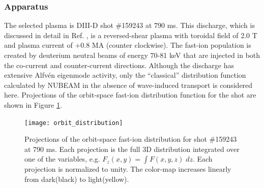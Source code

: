 \subsubsection{Apparatus} \label{sec:apparatus}
The selected plasma is 
DIII-D shot \#159243 at 790 ms. This discharge, which is discussed in detail in
 Ref. \cite{heidbrink2017}, is a reversed-shear plasma with toroidal field of 2.0 T and
plasma current of +0.8 MA (counter clockwise). The fast-ion population is created by
deuterium neutral beams of energy 70-81 keV that are injected in
both the co-current and counter-current directions. Although the discharge has extensive Alfv\'en
eigenmode activity, only the ``classical'' distribution function calculated by NUBEAM
\cite{NUBEAM} in the absence of wave-induced transport is considered here.
Projections of the orbit-space fast-ion distribution function for the shot are shown in 
Figure \ref{fig:distribution}.
\begin{figure}[ht]
    \centering
    \texttt{[image: orbit\_distribution]}
    \caption{Projections of the orbit-space fast-ion distribution for shot \#159243 at 790 ms. Each projection is the full 3D distribution integrated over one of the variables, e.g. $F_z(x,y) = \int F(x,y,z)\;dz$.  Each projection is normalized to unity. The color-map increases linearly from dark(black) to light(yellow).}
    \label{fig:distribution}
\end{figure}



